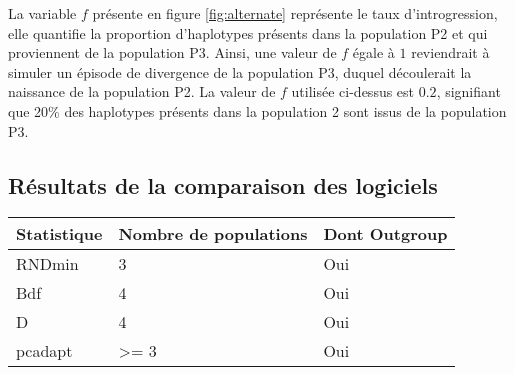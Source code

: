 \documentclass[12pt,twoside]{reedthesis}
\begin{document}
  La variable \(f\) présente en figure \ref{fig:alternate} représente le
  taux d'introgression, elle quantifie la proportion d'haplotypes présents
  dans la population P2 et qui proviennent de la population P3. Ainsi, une
  valeur de \(f\) égale à \(1\) reviendrait à simuler un épisode de
  divergence de la population P3, duquel découlerait la naissance de la
  population P2. La valeur de \(f\) utilisée ci-dessus est \(0.2\),
  signifiant que 20\% des haplotypes présents dans la population 2 sont
  issus de la population P3.
  
  \subsection{Résultats de la comparaison des
  logiciels}\label{resultats-de-la-comparaison-des-logiciels}
  
  \begin{Shaded}
  \begin{Highlighting}[]
  \StringTok{ }\NormalTok{(} \NormalTok{(}\NormalTok{, }\NormalTok{, }\NormalTok{, }\NormalTok{),}
                       \NormalTok{(}\NormalTok{, }\NormalTok{, }\NormalTok{, }\NormalTok{),}
                       \NormalTok{(}\NormalTok{, }\NormalTok{, }\NormalTok{, }\NormalTok{))}
  
                \NormalTok{(}\NormalTok{, }
                             \NormalTok{, }
                             \NormalTok{))}
  \end{Highlighting}
  \end{Shaded}
  
  \begin{longtable}[]{@{}lll@{}}
  \toprule
  Statistique & Nombre de populations & Dont Outgroup\tabularnewline
  \midrule
  \endhead
  RNDmin & 3 & Oui\tabularnewline
  Bdf & 4 & Oui\tabularnewline
  D & 4 & Oui\tabularnewline
  pcadapt & \textgreater{}= 3 & Oui\tabularnewline
  \bottomrule
  \end{longtable}
  
\end{document}
